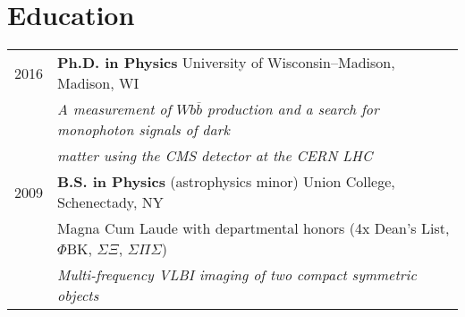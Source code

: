 \documentclass[letterpaper,12pt]{article} %
\begin{document}


\section{Education}
\begin{tabular}{rl}	
  2016 & {\bf Ph.D. in Physics} University of Wisconsin--Madison, Madison, WI \\
   {}  & \emph{A measurement of $Wb\overline{b}$ production and a search for monophoton signals of dark}\\
   {}  & \emph{matter using the CMS detector at the CERN LHC} \\

   2009 & {\bf B.S. in Physics} (astrophysics minor) Union College, Schenectady, NY \\
   {}  & Magna Cum Laude with departmental honors (4x Dean's List, $\Phi$BK, $\Sigma\Xi$, $\Sigma\Pi\Sigma$)\\
   {}  & \emph{Multi-frequency VLBI imaging of two compact symmetric objects} \\
\end{tabular}

\vspace{9pt}

\end{document}
